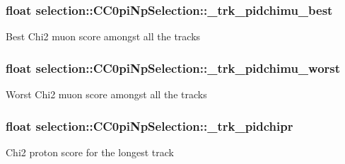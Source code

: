 \subsubsection[{\texorpdfstring{\+\_\+trk\+\_\+pidchimu\+\_\+best}{_trk_pidchimu_best}}]{\setlength{\rightskip}{0pt plus 5cm}float selection\+::\+C\+C0pi\+Np\+Selection\+::\+\_\+trk\+\_\+pidchimu\+\_\+best\hspace{0.3cm}{\ttfamily [private]}}\hypertarget{classselection_1_1CC0piNpSelection_a04216d0564f79f3c4a267130cd70e753}{}\label{classselection_1_1CC0piNpSelection_a04216d0564f79f3c4a267130cd70e753}
Best Chi2 muon score amongst all the tracks 
\subsubsection[{\texorpdfstring{\+\_\+trk\+\_\+pidchimu\+\_\+worst}{_trk_pidchimu_worst}}]{\setlength{\rightskip}{0pt plus 5cm}float selection\+::\+C\+C0pi\+Np\+Selection\+::\+\_\+trk\+\_\+pidchimu\+\_\+worst\hspace{0.3cm}{\ttfamily [private]}}\hypertarget{classselection_1_1CC0piNpSelection_a9e88e0ae759d19106d964c13926fba4b}{}\label{classselection_1_1CC0piNpSelection_a9e88e0ae759d19106d964c13926fba4b}
Worst Chi2 muon score amongst all the tracks 
\subsubsection[{\texorpdfstring{\+\_\+trk\+\_\+pidchipr}{_trk_pidchipr}}]{\setlength{\rightskip}{0pt plus 5cm}float selection\+::\+C\+C0pi\+Np\+Selection\+::\+\_\+trk\+\_\+pidchipr\hspace{0.3cm}{\ttfamily [private]}}\hypertarget{classselection_1_1CC0piNpSelection_a712eaf6dc6086f1be5705a3bbe5226fc}{}\label{classselection_1_1CC0piNpSelection_a712eaf6dc6086f1be5705a3bbe5226fc}
Chi2 proton score for the longest track 
